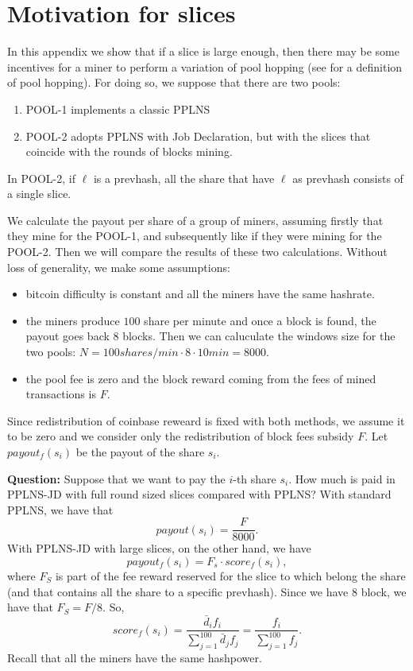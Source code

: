 \documentclass[11pt]{article} %
\begin{document}
\section{Motivation for slices}
In this appendix we show that if a slice is large enough, then there may be some incentives for a miner to perform a variation of pool hopping (see \cite{rosenfeld} for a definition of pool hopping). For doing so, we suppose that there are two pools:
\begin{enumerate}
	\item POOL-1 implements a classic PPLNS
	\item POOL-2 adopts PPLNS with Job Declaration, but with the slices that coincide with the rounds of blocks mining. 
\end{enumerate}
In POOL-2, if $\ell$ is a prevhash, all the share that have $\ell$ as prevhash consists of a single slice.

We calculate the payout per share of a group of miners, assuming firstly that they mine for the POOL-1, and subsequently like if they were mining for the POOL-2. Then we will compare the results of these two calculations. Without loss of generality, we make some assumptions:
\begin{itemize}
	\item bitcoin difficulty is constant and all the miners have the same hashrate.
	\item the miners produce $100$ share per minute and once a block is found, the payout goes back $8$ blocks. Then we can caluculate the windows size for the two pools: $N = 100 shares/min \cdot 8 \cdot 10min = 8000$.
	\item the pool fee is zero and the block reward coming from the fees of mined transactions is $F$. 
	
\end{itemize}
Since redistribution of coinbase reweard is fixed with both methods, we assume it to be zero and we consider only the redistribution of block fees subsidy $F$.
Let $payout_f(s_i)$ be the payout of the share $s_i$.

\textbf{Question:} Suppose that we want to pay the $i$-th share $s_i$. How much is paid in PPLNS-JD with full round sized slices compared with PPLNS?
With standard PPLNS, we have that
\[payout(s_i) = \frac{F}{8000}.\]
With PPLNS-JD with large slices, on the other hand, we have
\[payout_f(s_i) = F_s\cdot score_f(s_i),\]
where $F_S$ is part of the fee reward reserved for the slice to which belong the share (and that contains all the share to a specific prevhash). Since we have $8$ block, we have that $F_S = F/8$. So,
\[score_f(s_i) = \frac{\bar d_i f_i}{\sum_{j=1}^{100} \bar d_j f_j}= \frac{ f_i}{\sum_{j=1}^{100} f_j}. \]
Recall that all the miners have the same hashpower.
\end{document}
